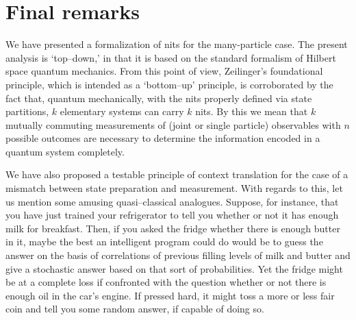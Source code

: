 \documentclass{article}
\begin{document}
\section{Final remarks}

%

We have presented a formalization of nits for the many-particle case.
The present analysis is `top--down,' in that it is based on the standard formalism of
Hilbert space quantum mechanics.
From this point of view,
Zeilinger's foundational principle, which is intended as a `bottom--up'  principle,
is corroborated by the fact that,
quantum mechanically, with the nits properly defined via state partitions,
$k$ elementary systems can carry $k$ nits.
By this we mean that
$k$ mutually commuting
measurements of (joint or single particle)
observables with $n$ possible outcomes are necessary to determine the information
encoded in a quantum system completely.

We have also proposed a testable principle of context translation for the case
of a mismatch between state preparation and measurement.
With regards to this,
let us mention some amusing quasi--classical analogues.
Suppose, for instance, that you have just trained your refrigerator to tell you whether
or not it has enough milk for breakfast.
Then, if you asked the fridge whether there is enough butter in it,
maybe the best an intelligent program could do would be to guess the answer
on the basis of correlations of previous filling levels of milk and butter
and give a stochastic answer based on that sort of probabilities.
Yet the fridge might be at a complete loss if confronted with the question
whether or not there is enough oil in the car's engine.
If pressed hard,
it might toss a more or less fair coin and tell you some random answer,
if capable of doing so.
\end{document}
